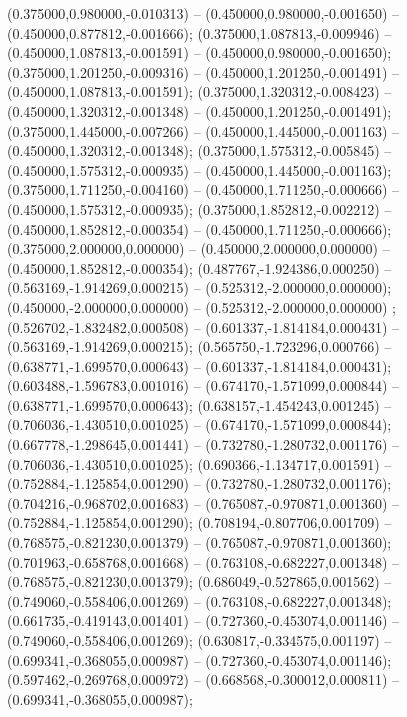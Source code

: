  (0.375000,0.980000,-0.010313) -- (0.450000,0.980000,-0.001650) -- (0.450000,0.877812,-0.001666);
 (0.375000,1.087813,-0.009946) -- (0.450000,1.087813,-0.001591) -- (0.450000,0.980000,-0.001650);
 (0.375000,1.201250,-0.009316) -- (0.450000,1.201250,-0.001491) -- (0.450000,1.087813,-0.001591);
 (0.375000,1.320312,-0.008423) -- (0.450000,1.320312,-0.001348) -- (0.450000,1.201250,-0.001491);
 (0.375000,1.445000,-0.007266) -- (0.450000,1.445000,-0.001163) -- (0.450000,1.320312,-0.001348);
 (0.375000,1.575312,-0.005845) -- (0.450000,1.575312,-0.000935) -- (0.450000,1.445000,-0.001163);
 (0.375000,1.711250,-0.004160) -- (0.450000,1.711250,-0.000666) -- (0.450000,1.575312,-0.000935);
 (0.375000,1.852812,-0.002212) -- (0.450000,1.852812,-0.000354) -- (0.450000,1.711250,-0.000666);
 (0.375000,2.000000,0.000000) -- (0.450000,2.000000,0.000000) -- (0.450000,1.852812,-0.000354);
 (0.487767,-1.924386,0.000250) -- (0.563169,-1.914269,0.000215) -- (0.525312,-2.000000,0.000000);
 (0.450000,-2.000000,0.000000) -- (0.525312,-2.000000,0.000000) ;
 (0.526702,-1.832482,0.000508) -- (0.601337,-1.814184,0.000431) -- (0.563169,-1.914269,0.000215);
 (0.565750,-1.723296,0.000766) -- (0.638771,-1.699570,0.000643) -- (0.601337,-1.814184,0.000431);
 (0.603488,-1.596783,0.001016) -- (0.674170,-1.571099,0.000844) -- (0.638771,-1.699570,0.000643);
 (0.638157,-1.454243,0.001245) -- (0.706036,-1.430510,0.001025) -- (0.674170,-1.571099,0.000844);
 (0.667778,-1.298645,0.001441) -- (0.732780,-1.280732,0.001176) -- (0.706036,-1.430510,0.001025);
 (0.690366,-1.134717,0.001591) -- (0.752884,-1.125854,0.001290) -- (0.732780,-1.280732,0.001176);
 (0.704216,-0.968702,0.001683) -- (0.765087,-0.970871,0.001360) -- (0.752884,-1.125854,0.001290);
 (0.708194,-0.807706,0.001709) -- (0.768575,-0.821230,0.001379) -- (0.765087,-0.970871,0.001360);
 (0.701963,-0.658768,0.001668) -- (0.763108,-0.682227,0.001348) -- (0.768575,-0.821230,0.001379);
 (0.686049,-0.527865,0.001562) -- (0.749060,-0.558406,0.001269) -- (0.763108,-0.682227,0.001348);
 (0.661735,-0.419143,0.001401) -- (0.727360,-0.453074,0.001146) -- (0.749060,-0.558406,0.001269);
 (0.630817,-0.334575,0.001197) -- (0.699341,-0.368055,0.000987) -- (0.727360,-0.453074,0.001146);
 (0.597462,-0.269768,0.000972) -- (0.668568,-0.300012,0.000811) -- (0.699341,-0.368055,0.000987);
